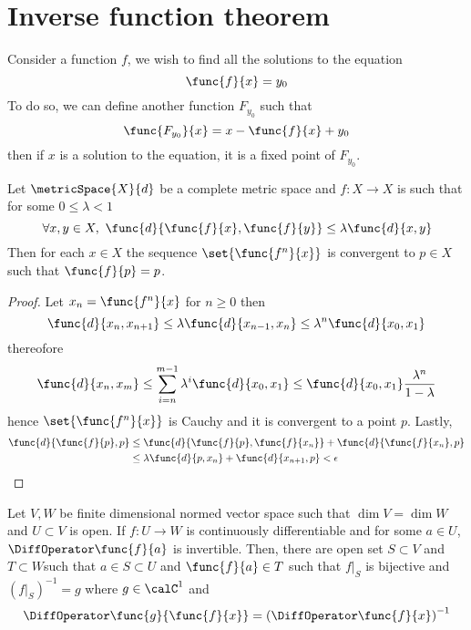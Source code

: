 \section{Inverse function theorem}
Consider a function \(f\), we wish to find all the solutions to the equation
\begin{equation*}
    \func{f}{x} = y_0
\end{equation*}
To do so, we can define another function \(F_{y_0}\) such that
\begin{equation*}
    \func{F_{y_0}}{x} = x - \func{f}{x} + y_0
\end{equation*}
then if \(x\) is a solution to the equation, it is a fixed point of \(F_{y_0}\).

\begin{theorem}  \label{th:BanachFixedPoint}
    Let \(\metricSpace{X}{d}\) be a complete metric space and \(f : X \to X\) is such that for some \(0 \leq \lambda < 1\)
    \begin{equation*}
        \forall x,y \in X, \ \func{d}{\func{f}{x},\func{f}{y}} \leq \lambda \func{d}{x,y}
    \end{equation*}
    Then for each \(x \in X\) the sequence \(\set{\func{f^n}{x}}\) is convergent to \(p \in X\) such that \(\func{f}{p} = p \).
\end{theorem}

\begin{proof}
    Let \(x_n = \func{f^n}{x}\) for \(n \geq 0\) then
    \begin{equation*}
        \func{d}{x_n,x_{n+1}} \leq \lambda \func{d}{x_{n-1},x_{n}} \leq \lambda^n \func{d}{x_0,x_1}
    \end{equation*}
    thereofore
    \begin{equation*}
        \func{d}{x_n,x_m} \leq \sum_{i = n}^{m-1} \lambda^i \func{d}{x_0,x_1} \leq \func{d}{x_0,x_1} \dfrac{\lambda^n}{1 - \lambda}
    \end{equation*}
    hence \(\set{\func{f^n}{x}}\) is Cauchy and it is convergent to a point \(p\). Lastly,
    \begin{align*}
        \func{d}{\func{f}{p},p} & \leq \func{d}{\func{f}{p},\func{f}{x_n}} + \func{d}{\func{f}{x_n},p} \\
                                & \leq \lambda \func{d}{p,x_n} + \func{d}{x_{n+1},p} < \epsilon
    \end{align*}
\end{proof}

\begin{theorem}
    Let \(V,W\) be finite dimensional normed vector space such that \(\dim V = \dim W\) and \(U \subset V\) is open. If \(f : U \to W\) is continuously differentiable and for some \(a \in U\), \(\DiffOperator \func{f}{a}\) is invertible. Then, there are open set \(S \subset V\) and \(T \subset W\)such that \(a \in S  \subset U\) and \(\func{f}{a} \in T\) such that \(f|_S\) is bijective and \((f|_S)^{-1} = g\) where \(g \in \calC^1\) and
    \begin{equation*}
        \DiffOperator \func{g}{\func{f}{x}} = \left(\DiffOperator \func{f}{x}\right)^{-1}
    \end{equation*}
\end{theorem}

